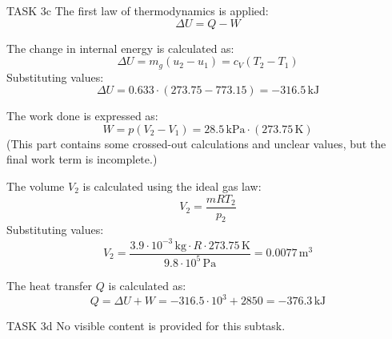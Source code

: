 TASK 3c  
The first law of thermodynamics is applied:  
\[
\Delta U = Q - W
\]  

The change in internal energy is calculated as:  
\[
\Delta U = m_g (u_2 - u_1) = c_V (T_2 - T_1)
\]  
Substituting values:  
\[
\Delta U = 0.633 \cdot (273.75 - 773.15) = -316.5 \, \text{kJ}
\]  

The work done is expressed as:  
\[
W = p (V_{2} - V_{1}) = 28.5 \, \text{kPa} \cdot (273.75 \, \text{K})
\]  
(This part contains some crossed-out calculations and unclear values, but the final work term is incomplete.)  

The volume \( V_2 \) is calculated using the ideal gas law:  
\[
V_2 = \frac{m R T_2}{p_2}
\]  
Substituting values:  
\[
V_2 = \frac{3.9 \cdot 10^{-3} \, \text{kg} \cdot R \cdot 273.75 \, \text{K}}{9.8 \cdot 10^5 \, \text{Pa}} = 0.0077 \, \text{m}^3
\]  

The heat transfer \( Q \) is calculated as:  
\[
Q = \Delta U + W = -316.5 \cdot 10^3 + 2850 = -376.3 \, \text{kJ}
\]  

TASK 3d  
No visible content is provided for this subtask.  

